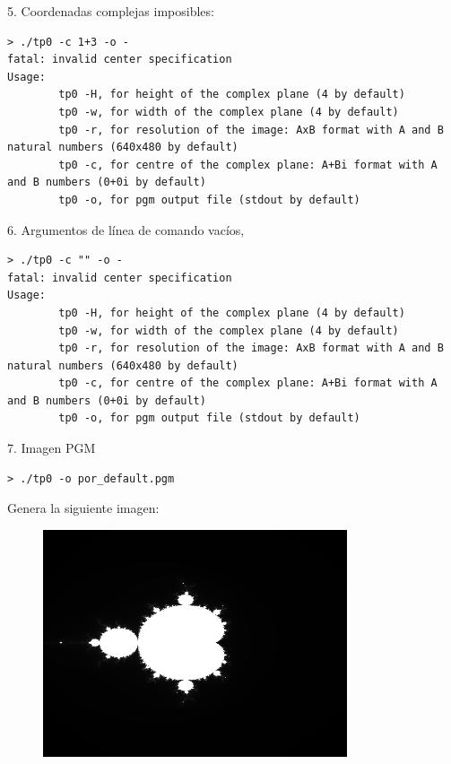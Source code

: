 \documentclass[a4paper,10pt]{article}
\begin{document}
5. Coordenadas complejas imposibles:
\begin{verbatim}
> ./tp0 -c 1+3 -o -
fatal: invalid center specification
Usage:
		tp0 -H, for height of the complex plane (4 by default)
		tp0 -w, for width of the complex plane (4 by default)
		tp0 -r, for resolution of the image: AxB format with A and B natural numbers (640x480 by default)
		tp0 -c, for centre of the complex plane: A+Bi format with A and B numbers (0+0i by default)
		tp0 -o, for pgm output file (stdout by default)
\end{verbatim}


6. Argumentos de l\'inea de comando vac\'ios,
\begin{verbatim}
> ./tp0 -c "" -o -
fatal: invalid center specification
Usage:
		tp0 -H, for height of the complex plane (4 by default)
		tp0 -w, for width of the complex plane (4 by default)
		tp0 -r, for resolution of the image: AxB format with A and B natural numbers (640x480 by default)
		tp0 -c, for centre of the complex plane: A+Bi format with A and B numbers (0+0i by default)
		tp0 -o, for pgm output file (stdout by default)
\end{verbatim}


7. Imagen PGM
\begin{verbatim}
> ./tp0 -o por_default.pgm
\end{verbatim}
Genera la siguiente imagen:
\begin{figure}
\begin{center}
\includegraphics[width=0.8\textwidth]{./por_default.png}
\label{fig:Region barrida por defecto}
\caption{}
\end{center}
\end{figure}
\end{document}
